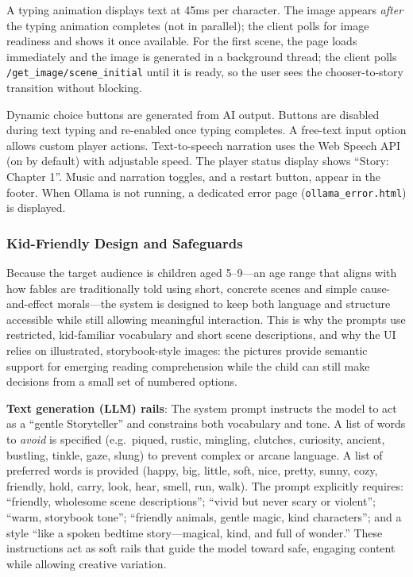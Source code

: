 \documentclass[12pt,a4paper]{article}
\newcommand{\breakablegetimage}[1]{\texttt{/get\_image/}\allowbreak\texttt{#1}}
\begin{document}
A typing animation displays text at 45ms per character. The image appears \emph{after} the typing animation completes (not in parallel); the client polls for image readiness and shows it once available. For the first scene, the page loads immediately and the image is generated in a background thread; the client polls \breakablegetimage{scene\_initial} until it is ready, so the user sees the chooser-to-story transition without blocking.

Dynamic choice buttons are generated from AI output. Buttons are disabled during text typing and re-enabled once typing completes. A free-text input option allows custom player actions. Text-to-speech narration uses the Web Speech API (on by default) with adjustable speed. The player status display shows ``Story: Chapter 1''. Music and narration toggles, and a restart button, appear in the footer. When Ollama is not running, a dedicated error page (\texttt{ollama\_error.html}) is displayed.

\subsubsection{Kid-Friendly Design and Safeguards}

Because the target audience is children aged 5--9—an age range that aligns with how fables are traditionally told using short, concrete scenes and simple cause-and-effect morals—the system is designed to keep both language and structure accessible while still allowing meaningful interaction. This is why the prompts use restricted, kid-familiar vocabulary and short scene descriptions, and why the UI relies on illustrated, storybook-style images: the pictures provide semantic support for emerging reading comprehension while the child can still make decisions from a small set of numbered options.

\textbf{Text generation (LLM) rails}: The system prompt instructs the model to act as a ``gentle Storyteller'' and constrains both vocabulary and tone. A list of words to \emph{avoid} is specified (e.g.\ piqued, rustic, mingling, clutches, curiosity, ancient, bustling, tinkle, gaze, slung) to prevent complex or arcane language. A list of preferred words is provided (happy, big, little, soft, nice, pretty, sunny, cozy, friendly, hold, carry, look, hear, smell, run, walk). The prompt explicitly requires: ``friendly, wholesome scene descriptions''; ``vivid but never scary or violent''; ``warm, storybook tone''; ``friendly animals, gentle magic, kind characters''; and a style ``like a spoken bedtime story---magical, kind, and full of wonder.'' These instructions act as soft rails that guide the model toward safe, engaging content while allowing creative variation.
\end{document}
